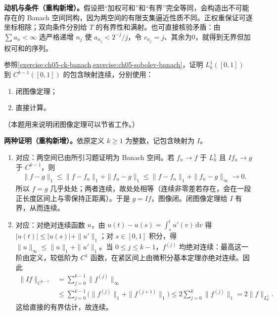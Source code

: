 \documentclass[../../main.tex]{subfiles}
\begin{document}
\begin{remark}
\textbf{动机与条件（重构新增）。}假设把“加权可和”和“有界”完全等同，会构造出不可能存在的 Banach 空间同构，因为两空间的有限支集逼近性质不同。正权重保证可逐坐标相除；双向条件分别给 $T$ 的有界性和满射。也可直接核验矛盾：由 $\sum a_n<\infty$ 选严格递增 $n_j$ 使 $a_{n_j}<2^{-j}/j$，令 $c_{n_j}=j$、其余为0，就得到无界但加权可和的序列。
\end{remark}
\begin{exercise}\label{exercise:ch05-sobolev-inclusion}
参照\cref{exercise:ch05-ck-banach,exercise:ch05-sobolev-banach}，证明 $L_k^1([0,1])$ 到 $C^{k-1}([0,1])$ 的包含映射连续，分别使用：
\begin{enumerate}
\item\label{item:ch05-inclusion-closed-graph} 闭图像定理；
\item\label{item:ch05-inclusion-direct-bound} 直接计算。
\end{enumerate}
（本题用来说明闭图像定理可以节省工作。）
\end{exercise}
\begin{solution}
\textbf{两种证明（重构新增）。}依原定义 $k\ge1$ 为整数，记包含映射为 $I$。
\begin{enumerate}
\item 对应：两空间已由所引习题证明为 Banach 空间。若 $f_n\to f$ 于 $L_k^1$ 且 $If_n\to g$ 于 $C^{k-1}$，则
\begin{align*}
\|f-g\|_1\le\|f-f_n\|_1+\|f_n-g\|_1
\le\|f-f_n\|_1+\|f_n-g\|_\infty\longrightarrow0.
\end{align*}
所以 $f=g$ 几乎处处；两者连续，故处处相等（连续非零差若存在，会在一段正长度区间上与零保持正距离）。于是 $g=If$，图像闭。闭图像定理给 $I$ 有界，从而连续。
\item 对应：对绝对连续函数 $u$，由 $u(t)-u(s)=\int_s^tu'(v)\,\mathrm dv$ 得 $|u(t)|\le|u(s)|+\|u'\|_1$；对 $s\in[0,1]$ 积分，得 $\|u\|_\infty\le\|u\|_1+\|u'\|_1$。当 $0\le j\le k-1$，$f^{(j)}$ 均绝对连续：最高这一阶由定义，较低阶为 $C^1$ 函数，在紧区间上由微积分基本定理亦绝对连续。因此
\begin{align*}
\|If\|_{C^{k-1}}&=\sum_{j=0}^{k-1}\|f^{(j)}\|_\infty\\
&\le\sum_{j=0}^{k-1}\bigl(\|f^{(j)}\|_1+\|f^{(j+1)}\|_1\bigr)
\le2\sum_{j=0}^k\|f^{(j)}\|_1=2\|f\|_{L_k^1}.
\end{align*}
这给直接的有界估计，故连续。
\end{enumerate}
\end{solution}
\end{document}
